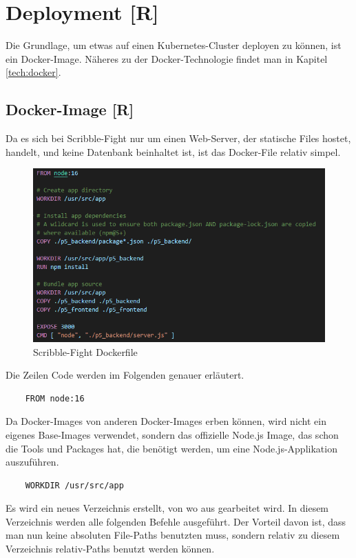 \section{Deployment [R]}
Die Grundlage, um etwas auf einen Kubernetes-Cluster deployen zu können, ist ein Docker-Image. Näheres zu der Docker-Technologie findet man in Kapitel \ref{tech:docker}.
\subsection{Docker-Image [R]}
Da es sich bei Scribble-Fight nur um einen Web-Server, der statische Files hostet, handelt, und keine Datenbank beinhaltet ist, ist das Docker-File relativ simpel.
\begin{figure}[H]
    \centering
    \includegraphics[scale=0.85]{pics/dockerfile_scribble.PNG}
    \caption{Scribble-Fight Dockerfile}
\end{figure}
Die Zeilen Code werden im Folgenden genauer erläutert. \\
\begin{lstlisting}
    FROM node:16
\end{lstlisting}
Da Docker-Images von anderen Docker-Images erben können, wird nicht ein eigenes Base-Images verwendet, sondern das offizielle Node.js Image, das schon die Tools und Packages hat, die benötigt werden, um eine Node.js-Applikation auszuführen.
\\
\begin{lstlisting}
    WORKDIR /usr/src/app
\end{lstlisting}
Es wird ein neues Verzeichnis erstellt, von wo aus gearbeitet wird.
In diesem Verzeichnis werden alle folgenden Befehle ausgeführt. Der Vorteil davon ist, dass man nun keine absoluten File-Paths benutzten muss, sondern relativ zu diesem Verzeichnis relativ-Paths benutzt werden können. \\


